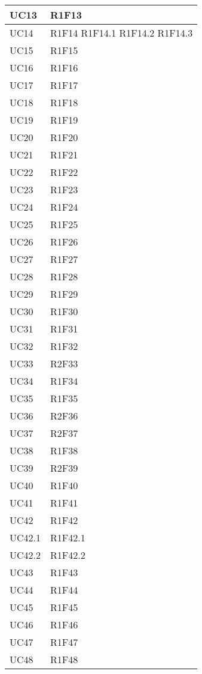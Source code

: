 \begin{center}
\begin{longtable}{|p{44mm}|p{22mm}|}
\hline
UC13 &
R1F13 
\\
\hline
UC14 &
R1F14 \newline
R1F14.1 \newline
R1F14.2 \newline
R1F14.3 
\\
\hline
UC15 &
R1F15 
\\
\hline
UC16 &
R1F16 
\\
\hline
UC17 &
R1F17 
\\
\hline
UC18 &
R1F18 
\\
\hline
UC19 &
R1F19 
\\
\hline
UC20 &
R1F20 
\\
\hline
UC21 &
R1F21 
\\
\hline
UC22 &
R1F22 
\\
\hline
UC23 &
R1F23 
\\
\hline
UC24 &
R1F24 
\\
\hline
UC25 &
R1F25 
\\
\hline
UC26 &
R1F26 
\\
\hline
UC27 &
R1F27 
\\
\hline
UC28 &
R1F28 
\\
\hline
UC29 &
R1F29 
\\
\hline
UC30 &
R1F30 
\\
\hline
UC31 &
R1F31 
\\
\hline
UC32 &
R1F32 
\\
\hline
UC33 &
R2F33 
\\
\hline
UC34 &
R1F34 
\\
\hline
UC35 &
R1F35 
\\
\hline
UC36 &
R2F36 
\\
\hline
UC37 &
R2F37 
\\
\hline
UC38 &
R1F38 
\\
\hline
UC39 &
R2F39 
\\
\hline
UC40 &
R1F40 
\\
\hline
UC41 &
R1F41 
\\
\hline
UC42 &
R1F42 
\\
\hline
UC42.1 &
R1F42.1 
\\
\hline
UC42.2 &
R1F42.2 
\\
\hline
UC43 &
R1F43 
\\
\hline
UC44 &
R1F44 
\\
\hline
UC45 &
R1F45 
\\
\hline
UC46 &
R1F46 
\\
\hline
UC47 &
R1F47 
\\
\hline
UC48 &
R1F48 
\\

\end{longtable}
\end{center}
